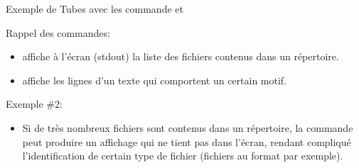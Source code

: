 \begin{frame}{Exemple de Tubes avec les commande  et }
  \begin{block}{Rappel des commandes:}
    \begin{itemize}
    \item {} affiche à l'écran (stdout) la liste des fichiers
      contenus dans un répertoire.
    \item {} affiche les lignes d'un texte qui comportent un
      certain motif.
    \end{itemize}
  \end{block}
  \begin{alertblock}{Exemple \#2:}
    \begin{itemize}
    \item Si de très nombreux fichiers sont contenus dans un répertoire,
      la commande  peut produire un affichage qui ne tient pas
      dans l'écran, rendant compliqué l'identification de certain type
      de fichier (fichiers au format  par exemple).
    \end{itemize}
    \begin{columns}
      \begin{column}{6cm}
        \small{  }
      \end{column}
      \begin{column}{6cm}
      \end{column}
    \end{columns}
  \end{alertblock}
\end{frame}

